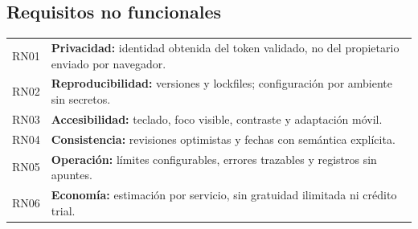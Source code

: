 \subsection{Requisitos no funcionales}
\begin{tabularx}{\linewidth}{P{1cm}Y}
\toprule
RN01 & \textbf{Privacidad:} identidad obtenida del token validado, no del propietario enviado por navegador.\\
RN02 & \textbf{Reproducibilidad:} versiones y lockfiles; configuración por ambiente sin secretos.\\
RN03 & \textbf{Accesibilidad:} teclado, foco visible, contraste y adaptación móvil.\\
RN04 & \textbf{Consistencia:} revisiones optimistas y fechas con semántica explícita.\\
RN05 & \textbf{Operación:} límites configurables, errores trazables y registros sin apuntes.\\
RN06 & \textbf{Economía:} estimación por servicio, sin gratuidad ilimitada ni crédito trial.\\
\bottomrule
\end{tabularx}
